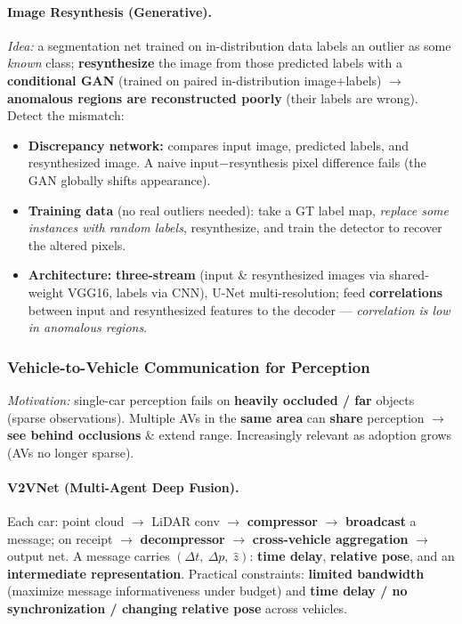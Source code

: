 \documentclass{article}
\begin{document}
\paragraph{Image Resynthesis (Generative).}
\textit{Idea:} a segmentation net trained on in-distribution data labels an outlier as some \textit{known} class; \textbf{resynthesize} the image from those predicted labels with a \textbf{conditional GAN} (trained on paired in-distribution image$+$labels) $\rightarrow$ \textbf{anomalous regions are reconstructed poorly} (their labels are wrong). Detect the mismatch:
\begin{itemize}
    \item \textbf{Discrepancy network:} compares input image, predicted labels, and resynthesized image. A naive input$-$resynthesis pixel difference fails (the GAN globally shifts appearance).
    \item \textbf{Training data} (no real outliers needed): take a GT label map, \textit{replace some instances with random labels}, resynthesize, and train the detector to recover the altered pixels.
    \item \textbf{Architecture:} \textbf{three-stream} (input \& resynthesized images via shared-weight VGG16, labels via CNN), U-Net multi-resolution; feed \textbf{correlations} between input and resynthesized features to the decoder --- \textit{correlation is low in anomalous regions}.
\end{itemize}

\subsubsection{Vehicle-to-Vehicle Communication for Perception}
\textit{Motivation:} single-car perception fails on \textbf{heavily occluded / far} objects (sparse observations). Multiple AVs in the \textbf{same area} can \textbf{share} perception $\rightarrow$ \textbf{see behind occlusions} \& extend range. Increasingly relevant as adoption grows (AVs no longer sparse).

\paragraph{V2VNet (Multi-Agent Deep Fusion).}
Each car: point cloud $\rightarrow$ LiDAR conv $\rightarrow$ \textbf{compressor} $\rightarrow$ \textbf{broadcast} a message; on receipt $\rightarrow$ \textbf{decompressor} $\rightarrow$ \textbf{cross-vehicle aggregation} $\rightarrow$ output net. A message carries $(\Delta t,\ \Delta p,\ \hat z)$: \textbf{time delay}, \textbf{relative pose}, and an \textbf{intermediate representation}. Practical constraints: \textbf{limited bandwidth} (maximize message informativeness under budget) and \textbf{time delay / no synchronization / changing relative pose} across vehicles.\\
\end{document}
